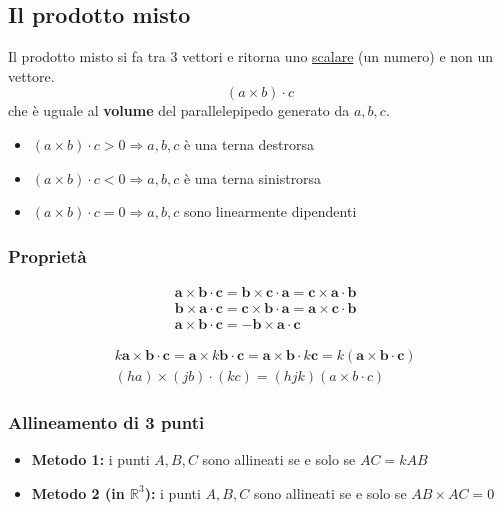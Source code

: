 \documentclass[../main.tex]{subfiles}
\begin{document}
\pagebreak
\subsection{Il prodotto misto}
Il prodotto misto si fa tra 3 vettori e ritorna uno \underline{scalare} (un numero) e non un vettore.
$$
    (a\times b) \cdot c
$$
che è uguale al \textbf{volume} del parallelepipedo generato da $a,b,c$.

\begin{itemize}
    \item $(a\times b) \cdot c > 0\Rightarrow a,b,c$ è una terna destrorsa
    \item $(a\times b) \cdot c < 0\Rightarrow a,b,c$ è una terna sinistrorsa
    \item $(a\times b) \cdot c = 0\Rightarrow a,b,c$ sono linearmente dipendenti
\end{itemize}

\subsubsection{Proprietà}
\begin{align*}
    &\mathbf{a \times b\cdot c}=\mathbf{b\times c\cdot a}=\mathbf{c\times a\cdot b} \\
    &\mathbf{b\times a\cdot c}=\mathbf{c\times b\cdot a}=\mathbf{a\times c\cdot b} \\
    &\mathbf{a\times b\cdot c}=-\mathbf{b\times a\cdot c}
\end{align*}

\begin{align*}
    &k\mathbf{a}\times\mathbf{b}\cdot\mathbf{c}=\mathbf{a}\times k\mathbf{b}\cdot\mathbf{c}=\mathbf{a}\times\mathbf{b}\cdot k\mathbf{c}=k(\mathbf{a}\times\mathbf{b}\cdot\mathbf{c}) \\
    &(ha)\times(jb)\cdot(kc)=(hjk)(a\times b\cdot c)
\end{align*}

\subsubsection{Allineamento di 3 punti}
\begin{itemize}
    \item \textbf{Metodo 1:} i punti $A,B,C$ sono allineati se e solo se $AC = kAB$
    \item \textbf{Metodo 2 (in $\mathbb{R}^3$):} i punti $A,B,C$ sono allineati se e solo se $AB \times AC = 0$
\end{itemize}
\end{document}
